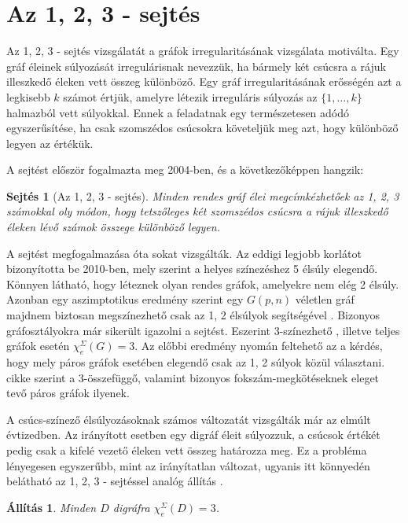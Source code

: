\documentclass[12pt, a4paper]{report}
\newtheorem{áll}[tét]{Állítás}
\newtheorem{sej}[tét]{Sejtés}
\theoremstyle{remark}
\theoremstyle{definition}
\begin{document}
\section{Az 1, 2, 3 - sejtés}
Az 1, 2, 3 - sejtés vizsgálatát a gráfok irregularitásának vizsgálata motiválta. Egy gráf éleinek súlyozását irregulárisnak nevezzük, ha bármely két csúcsra a rájuk illeszkedő éleken vett összeg különböző. Egy gráf irregularitásának erősségén azt a legkisebb $k$ számot értjük, amelyre létezik irreguláris súlyozás az $\lbrace 1, \ldots, k \rbrace$ halmazból vett súlyokkal. Ennek a feladatnak egy természetesen adódó egyszerűsítése, ha csak szomszédos csúcsokra követeljük meg azt, hogy különböző legyen az értékük. 

A sejtést először \citeauthor{Karonski2004} \cite{Karonski2004} fogalmazta meg 2004-ben, és a következőképpen hangzik: 

\begin{sej}[Az 1, 2, 3 - sejtés]
Minden rendes gráf élei megcímkézhetőek az 1, 2, 3 számokkal oly módon, hogy tetszőleges két szomszédos csúcsra a rájuk illeszkedő éleken lévő számok összege különböző legyen.
\end{sej}

A sejtést megfogalmazása óta sokat vizsgálták. Az eddigi legjobb korlátot \citeauthor{Kalkowski2010} \cite{Kalkowski2010} bizonyította be 2010-ben, mely szerint a helyes színezéshez 5 élsúly elegendő. Könnyen látható, hogy léteznek olyan rendes gráfok, amelyekre nem elég 2 élsúly. Azonban egy aszimptotikus eredmény szerint egy $G(p, n)$ véletlen gráf majdnem biztosan megszínezhető csak az 1, 2 élsúlyok segítségével \cite{AddarioBerry2008}. Bizonyos gráfosztályokra már sikerült igazolni a sejtést. Eszerint 3-színezhető \cite{Karonski2004}, illetve teljes gráfok \cite{Alaeiyan2012} esetén $\chi_e^{\Sigma}(G) = 3$. Az előbbi eredmény nyomán feltehető az a kérdés, hogy mely páros gráfok esetében elegendő csak az 1, 2 súlyok közül választani. \citeauthor{Lu2011} \cite{Lu2011} cikke szerint a 3-összefüggő, valamint bizonyos fokszám-megkötéseknek eleget tevő páros gráfok ilyenek.

A csúcs-színező élsúlyozásoknak számos változatát vizsgálták már az elmúlt évtizedben. Az irányított esetben egy digráf éleit súlyozzuk, a csúcsok értékét pedig csak a kifelé vezető éleken vett összeg határozza meg. Ez a probléma lényegesen egyszerűbb, mint az irányítatlan változat, ugyanis itt könnyedén belátható az 1, 2, 3 - sejtéssel analóg állítás \cite{Baudon2014}.

\begin{áll}
Minden $D$ digráfra $\chi_e^{\Sigma}(D) = 3$.
\end{áll}
\end{document}
